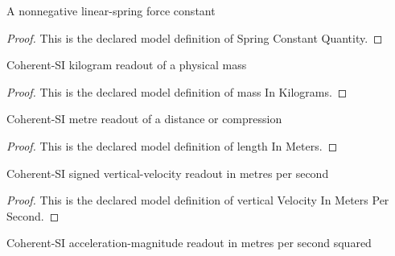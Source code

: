 \begin{definition}
  \label{def:physics:phyx-mini-0814:phyxminiproblems-problemphyxmini0814-springconstantquantity}
  A nonnegative linear-spring force constant
\end{definition}
\begin{proof}
  This is the declared model definition of Spring Constant Quantity.
\end{proof}
\begin{definition}
  \label{def:physics:phyx-mini-0814:phyxminiproblems-problemphyxmini0814-massinkilograms}
  Coherent-SI kilogram readout of a physical mass
\end{definition}
\begin{proof}
  This is the declared model definition of mass In Kilograms.
\end{proof}
\begin{definition}
  \label{def:physics:phyx-mini-0814:phyxminiproblems-problemphyxmini0814-lengthinmeters}
  Coherent-SI metre readout of a distance or compression
\end{definition}
\begin{proof}
  This is the declared model definition of length In Meters.
\end{proof}
\begin{definition}
  \label{def:physics:phyx-mini-0814:phyxminiproblems-problemphyxmini0814-verticalvelocityinmeterspersecond}
  Coherent-SI signed vertical-velocity readout in metres per second
\end{definition}
\begin{proof}
  This is the declared model definition of vertical Velocity In Meters Per Second.
\end{proof}
\begin{definition}
  \label{def:physics:phyx-mini-0814:phyxminiproblems-problemphyxmini0814-accelerationinmeterspersecondsquared}
  Coherent-SI acceleration-magnitude readout in metres per second squared
\end{definition}
